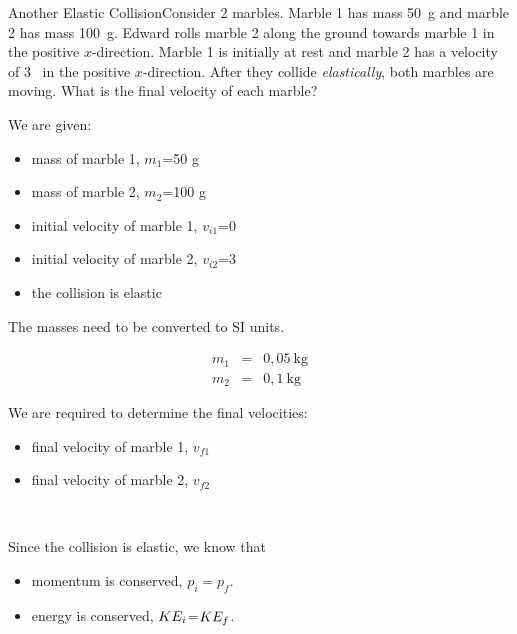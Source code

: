 \begin{wex}{Another Elastic Collision}{Consider 2 marbles. Marble 1 has mass 50~g and marble 2 has mass 100~g. Edward rolls marble 2 along the ground towards marble 1 in the positive $x$-direction. Marble 1 is initially at rest and marble 2 has a velocity of 3 \ms\ in the positive $x$-direction. After they collide \emph{elastically}, both marbles are moving. What is the final velocity of each marble?}
{
\begin{minipage}{.8\textwidth}
We are given:
\begin{itemize}
\item mass of marble 1, $m_1$=50 g
\item mass of marble 2, $m_2$=100 g
\item initial velocity of marble 1, $v_{i1}$=0 \ms
\item initial velocity of marble 2, $v_{i2}$=3 \ms
\item the collision is elastic
\end{itemize}

The masses need to be converted to SI units.
\end{minipage}
\begin{eqnarray*}
m_{1} &=& 0,05~\text{kg}\\
m_{2} &=& 0,1~\text{kg}
\end{eqnarray*}
\begin{minipage}{.8\textwidth}
We are required to determine the final velocities:
\begin{itemize}
\item final velocity of marble 1, $v_{f1}$
\item final velocity of marble 2, $v_{f2}$
\end{itemize}
\end{minipage}\\
\begin{minipage}{.8\textwidth}
Since the collision is elastic, we know that
\begin{itemize}

\item momentum is conserved, $p_i=p_f$.
\item energy is conserved, $KE_{i}$=$KE_{f}$.
\end{itemize}


\end{minipage}}
\end{wex}
